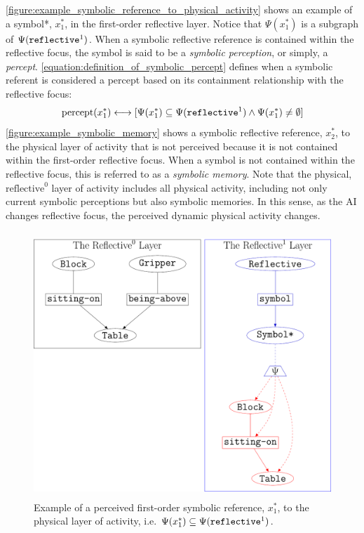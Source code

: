 {\mbox{\autoref{figure:example_symbolic_reference_to_physical_activity}}}
shows an example of a symbol*, $x_1^*$, in the first-order reflective
layer.  Notice that $\Psi(x_1^*)$ is a subgraph of
$\Psi(\text{\tt{reflective}}^1)$.  When a symbolic reflective
reference is contained within the reflective focus, the symbol is said
to be a \emph{symbolic perception}, or simply, a \emph{percept}.
{\mbox{\autoref{equation:definition_of_symbolic_percept}}} defines
when a symbolic referent is considered a percept based on its
containment relationship with the reflective focus:
\begin{equation}
\label{equation:definition_of_symbolic_percept}
\text{percept}(x_1^*) \longleftrightarrow [\Psi(x_1^*) \subseteq \Psi(\text{\tt{reflective}}^1) \wedge \Psi(x_1^*) \neq \emptyset]
\end{equation}
{\mbox{\autoref{figure:example_symbolic_memory}}} shows a symbolic
reflective reference, $x_2^*$, to the physical layer of activity that
is not perceived because it is not contained within the first-order
reflective focus.  When a symbol is not contained within the
reflective focus, this is referred to as a \emph{symbolic memory}.
Note that the physical, $\text{reflective}^0$ layer of activity
includes all physical activity, including not only current symbolic
perceptions but also symbolic memories.  In this sense, as the AI
changes reflective focus, the perceived dynamic physical activity
changes.
\begin{figure}
\center
\includegraphics[height=10cm]{gfx/example_symbolic_reference_to_physical_activity}
\caption[Example of a perceived first-order symbolic reference to the
  physical layer of activity.]{Example of a perceived first-order
  symbolic reference, $x_1^*$, to the physical layer of activity,
  i.e. $\Psi(x_1^*)\subseteq\Psi(\text{\tt{reflective}}^1)$.}
\label{figure:example_symbolic_reference_to_physical_activity}
\end{figure}
